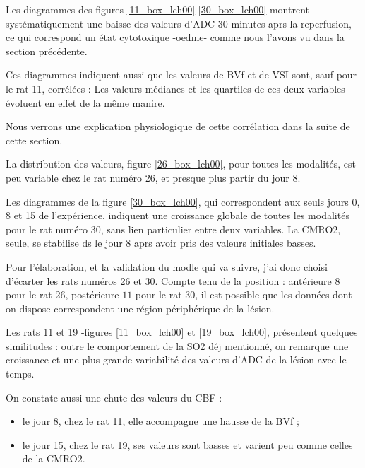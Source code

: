 \etoile
Les diagrammes des figures \ref{11_box_lch00}  \ref{30_box_lch00} montrent syst\'ematiquement une baisse des valeurs d'ADC 30 minutes aprs la reperfusion, %
ce qui correspond  un \'etat cytotoxique -oedme- comme nous l'avons vu dans la section pr\'ec\'edente.

\par
Ces diagrammes indiquent aussi que les valeurs de BVf et de VSI sont, sauf pour le rat 11, corr\'el\'ees : %
Les valeurs m\'edianes et les quartiles de ces deux variables \'evoluent en effet de la m\^eme manire.

\par
Nous verrons une explication physiologique de cette corr\'elation dans la suite de cette section.

\etoile
La distribution des valeurs, figure \ref{26_box_lch00}, pour toutes les modalit\'es, est peu variable chez le rat num\'ero 26, et presque plus  partir du jour 8.

\par
Les diagrammes de la figure \ref{30_box_lch00}, qui correspondent aux seuls jours 0, 8 et 15 de l'exp\'erience, %
indiquent une croissance globale de toutes les modalit\'es pour le rat num\'ero 30, %
sans lien particulier entre deux variables. %
La CMRO2, seule, se stabilise ds le jour 8 aprs avoir pris des valeurs initiales basses.

\par
Pour l'\'elaboration, et la validation du modle qui va suivre, j'ai donc choisi d'\'ecarter les rats num\'eros 26 et 30. %
Compte tenu de la position : ant\'erieure  $8$ pour le rat 26, post\'erieure  $11$ pour le rat 30, %
il est possible que les donn\'ees dont on dispose correspondent  une r\'egion p\'eriph\'erique de la l\'esion.

\etoile
Les rats 11 et 19 -figures \ref{11_box_lch00} et \ref{19_box_lch00}, pr\'esentent quelques similitudes : %
outre le comportement de la SO2 d\'ej mentionn\'e, on remarque une croissance et une plus grande variabilit\'e des valeurs d'ADC de la l\'esion avec le temps.

\par
On constate aussi une chute des valeurs du CBF :
\begin{itemize}
\item le jour 8, chez le rat 11, elle accompagne une hausse de la BVf ;
\item le jour 15, chez le rat 19, ses valeurs sont basses et varient peu comme celles de la CMRO2.
\end{itemize}

